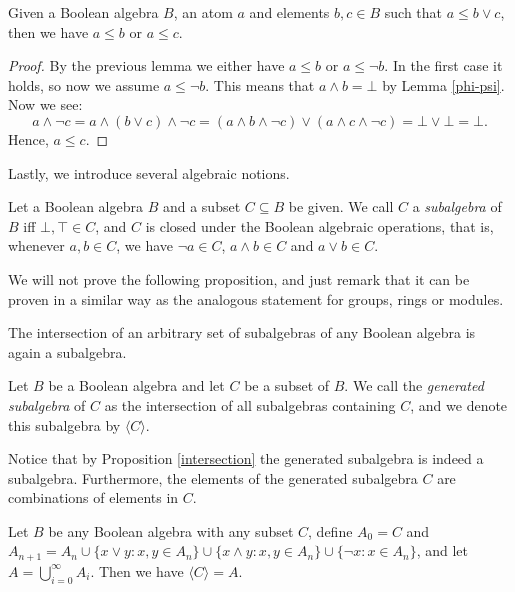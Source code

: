 \begin{lem}
Given a Boolean algebra $B$, an atom $a$ and elements $b, c \in B$ such that $a \leq b \lor c$, then we have $a \leq b$ or $a \leq c$.
\end{lem}

\begin{proof}
By the previous lemma we either have $a \leq b$ or $a \leq \neg b$. In the first case it holds, so now we assume $a \leq \neg b$. This means that $a \land b = \bot$ by Lemma \ref{phi-psi}. Now we see:
\[a \land \neg c = a \land (b \lor c) \land \neg c = (a \land b \land \neg c) \lor (a \land c \land \neg c) = \bot \lor \bot = \bot.\]
Hence, $a \leq c$. 
\end{proof}

Lastly, we introduce several algebraic notions.

\begin{definition}[Subalgebra]
\label{subalgebra}
Let a Boolean algebra $B$ and a subset $C \subseteq B$ be given. We call $C$ a \emph{subalgebra} of $B$ iff $\bot, \top \in C$, and $C$ is closed under the Boolean algebraic operations, that is, whenever $a, b \in C$, we have $\neg a \in C$, $a \land b \in C$ and $a \lor b \in C$.
\end{definition}

We will not prove the following proposition, and just remark that it can be proven in a similar way as the analogous statement for groups, rings or modules.

\begin{proposition}
\label{intersection}
The intersection of an arbitrary set of subalgebras of any Boolean algebra is again a subalgebra.
\end{proposition}

\begin{definition}
\label{gen-sub}
Let $B$ be a Boolean algebra and let $C$ be a subset of $B$. We call the \emph{generated subalgebra} of $C$ as the intersection of all subalgebras containing $C$, and we denote this subalgebra by $\langle C \rangle$.
\end{definition}

Notice that by Proposition \ref{intersection} the generated subalgebra is indeed a subalgebra. Furthermore, the elements of the generated subalgebra $C$ are combinations of elements in $C$.

\begin{proposition}
\label{subalgebra-induc}
Let $B$ be any Boolean algebra with any subset $C$, define $A_0 = C$ and $A_{n+1} = A_n \cup \{x \lor y : x, y \in A_n \} \cup \{x \land y : x, y \in A_n \} \cup \{\neg x : x \in A_n \}$, and let $A = \bigcup_{i=0}^\infty A_i$. Then we have $\langle C \rangle = A$.
\end{proposition}

